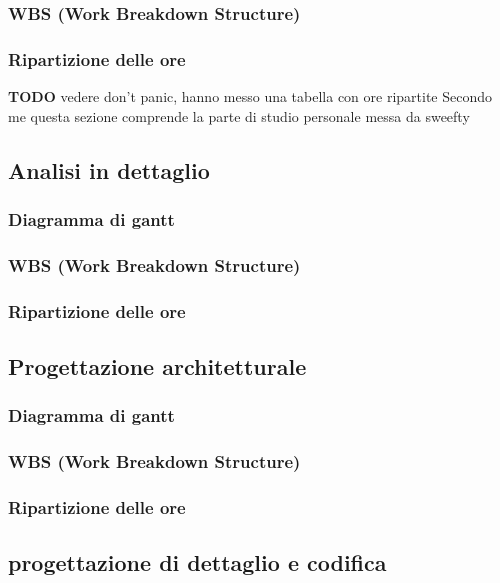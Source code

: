             \subsubsection{WBS (Work Breakdown Structure)}
            \subsubsection{Ripartizione delle ore}
                \textbf{TODO} vedere don't panic, hanno messo una tabella con ore ripartite
                Secondo me questa sezione comprende la parte di studio personale messa da sweefty
				
        \subsection{Analisi in dettaglio}
            \subsubsection{Diagramma di gantt}
            \subsubsection{WBS (Work Breakdown Structure)}
            \subsubsection{Ripartizione delle ore}

        \subsection{Progettazione architetturale}
            \subsubsection{Diagramma di gantt}
            \subsubsection{WBS (Work Breakdown Structure)}
            \subsubsection{Ripartizione delle ore}

        \subsection{progettazione di dettaglio e codifica}
